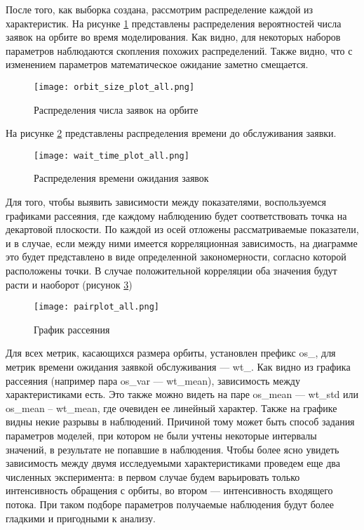 После того, как выборка создана, рассмотрим распределение каждой из характеристик. На рисунке \ref{orbit_size_plot_all} представлены распределения вероятностей числа заявок на орбите во время моделирования. Как видно, для некоторых наборов параметров наблюдаются скопления похожих распределений. Также видно, что с изменением параметров математическое ожидание заметно смещается.

\begin{figure}[H]
	\centering
	\texttt{[image: orbit\_size\_plot\_all.png]}
	\caption{Распределения числа заявок на орбите} 
	\label{orbit_size_plot_all}
\end{figure}

На рисунке \ref{wait_time_plot_all} представлены распределения времени до обслуживания заявки.

\begin{figure}[H]
	\centering
	\texttt{[image: wait\_time\_plot\_all.png]}
	\caption{Распределения времени ожидания заявок} 
	\label{wait_time_plot_all}
\end{figure}

Для того, чтобы выявить зависимости между показателями, воспользуемся графиками рассеяния, где каждому наблюдению будет соответствовать точка на декартовой плоскости. По каждой из осей отложены рассматриваемые показатели, и в случае, если между ними имеется корреляционная зависимость, на диаграмме это будет представлено в виде определенной закономерности, согласно которой расположены точки. В случае положительной корреляции оба значения будут расти и наоборот (рисунок \ref{os_wt_pairplot_all})
\begin{figure}[H]
	\centering
	\texttt{[image: pairplot\_all.png]}
	\caption{График рассеяния} 
	\label{os_wt_pairplot_all}
\end{figure}

Для всех метрик, касающихся размера орбиты, установлен префикс os\_, для метрик времени ожидания заявкой обслуживания --- wt\_. Как видно из графика рассеяния (например пара os\_var --- wt\_mean), зависимость между характеристиками есть. Это также можно видеть на паре os\_mean --- wt\_std или os\_mean -- wt\_mean, где очевиден ее линейный характер. Также на графике видны некие разрывы в наблюдений. Причиной тому может быть способ задания параметров моделей, при котором не были учтены некоторые интервалы значений, в результате не попавшие в наблюдения. Чтобы более ясно увидеть зависимость между двумя исследуемыми характеристиками проведем еще два численных эксперимента: в первом случае будем варьировать только интенсивность обращения с орбиты, во втором --- интенсивность входящего потока. При таком подборе параметров получаемые наблюдения будут более гладкими и пригодными к анализу.

